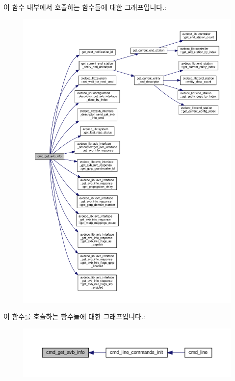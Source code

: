 이 함수 내부에서 호출하는 함수들에 대한 그래프입니다.\+:
\nopagebreak
\begin{figure}[H]
\begin{center}
\leavevmode
\includegraphics[width=350pt]{classcmd__line_a6a09693f01ee0f54f1513195b6d77122_cgraph}
\end{center}
\end{figure}




이 함수를 호출하는 함수들에 대한 그래프입니다.\+:
\nopagebreak
\begin{figure}[H]
\begin{center}
\leavevmode
\includegraphics[width=350pt]{classcmd__line_a6a09693f01ee0f54f1513195b6d77122_icgraph}
\end{center}
\end{figure}


